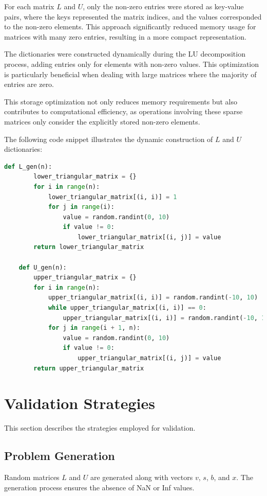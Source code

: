 \documentclass{article}
\begin{document}
For each matrix $L$ and $U$, only the non-zero entries were stored as key-value pairs, where the keys represented the matrix indices, and the values corresponded to the non-zero elements. This approach significantly reduced memory usage for matrices with many zero entries, resulting in a more compact representation.

The dictionaries were constructed dynamically during the LU decomposition process, adding entries only for elements with non-zero values. This optimization is particularly beneficial when dealing with large matrices where the majority of entries are zero.

This storage optimization not only reduces memory requirements but also contributes to computational efficiency, as operations involving these sparse matrices only consider the explicitly stored non-zero elements.

The following code snippet illustrates the dynamic construction of $L$ and $U$ dictionaries:

\begin{lstlisting}[language=Python, caption=Python code for generating $L$ and $U$]
    def L_gen(n):
        lower_triangular_matrix = {}
        for i in range(n):
            lower_triangular_matrix[(i, i)] = 1
            for j in range(i):
                value = random.randint(0, 10)
                if value != 0:
                    lower_triangular_matrix[(i, j)] = value
        return lower_triangular_matrix
    
    def U_gen(n):
        upper_triangular_matrix = {}
        for i in range(n):
            upper_triangular_matrix[(i, i)] = random.randint(-10, 10)
            while upper_triangular_matrix[(i, i)] == 0:
                upper_triangular_matrix[(i, i)] = random.randint(-10, 10)
            for j in range(i + 1, n):
                value = random.randint(0, 10)
                if value != 0:
                    upper_triangular_matrix[(i, j)] = value
        return upper_triangular_matrix
    \end{lstlisting}

\section{Validation Strategies}
This section describes the strategies employed for validation.

\subsection{Problem Generation}
Random matrices $L$ and $U$ are generated along with vectors $v$, $s$, $b$, and $x$. The generation process ensures the absence of NaN or Inf values.
\end{document}
